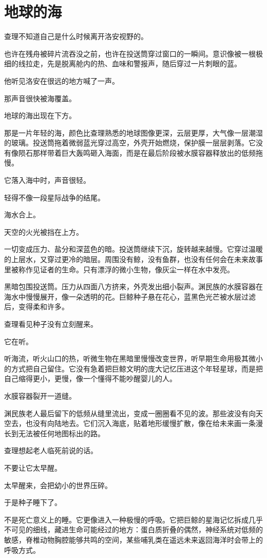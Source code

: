\chapter{地球的海}

查理不知道自己是什么时候离开洛安视野的。

也许在残舟被碎片流吞没之前，也许在投送筒穿过窗口的一瞬间。意识像被一根极细的线拉走，先是脱离舱内的热、血味和警报声，随后穿过一片刺眼的蓝。

他听见洛安在很远的地方喊了一声。

那声音很快被海覆盖。

地球的海出现在下方。

那是一片年轻的海，颜色比查理熟悉的地球图像更深，云层更厚，大气像一层潮湿的玻璃。投送筒拖着微弱蓝光穿过高空，外壳开始燃烧，保护膜一层层剥落。它没有像陨石那样带着巨大轰鸣砸入海面，而是在最后阶段被水膜容器释放出的低频拖慢。

它落入海中时，声音很轻。

轻得不像一段星际战争的结尾。

海水合上。

天空的火光被挡在上方。

一切变成压力、盐分和深蓝色的暗。投送筒继续下沉，旋转越来越慢。它穿过温暖的上层水，又穿过更冷的暗层。周围没有鲸，没有鱼群，也没有任何会在未来故事里被称作见证者的生命。只有漂浮的微小生物，像灰尘一样在水中发亮。

黑暗包围投送筒。压力从四面八方挤来，外壳发出细小裂声。渊民族的水膜容器在海水中慢慢展开，像一朵透明的花。巨鲸种子悬在花心，蓝黑色光芒被水层过滤后，变得柔和许多。

查理看见种子没有立刻醒来。

它在听。

听海流，听火山口的热，听微生物在黑暗里慢慢改变世界，听早期生命用极其微小的方式把自己留住。它没有急着把巨鲸文明的庞大记忆压进这个年轻星球，而是把自己缩得更小，更慢，像一个懂得不能吵醒婴儿的人。

水膜容器裂开一道缝。

渊民族老人最后留下的低频从缝里流出，变成一圈圈看不见的波。那些波没有向天空去，也没有向陆地去。它们沉入海底，贴着地形缓慢扩散，像在给未来画一条漫长到无法被任何地图标出的路。

查理想起老人临死前说的话。

不要让它太早醒。

太早醒来，会把幼小的世界压碎。

于是种子睡下了。

不是死亡意义上的睡。它更像进入一种极慢的呼吸。它把巨鲸的星海记忆拆成几乎不可见的细线，藏进生命可能经过的地方：蛋白质折叠的偶然，神经系统对低频的敏感，脊椎动物胸腔能够共鸣的空间，某些哺乳类在遥远未来返回海洋时会带上的呼吸方式。

